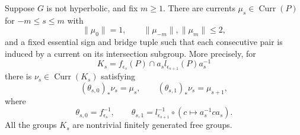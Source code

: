 \begin{lemma}
\label{ann:finite-current-window}
Suppose $G$ is not hyperbolic, and fix $m\geq1$.  There are currents
$\mu_s\in\operatorname{Curr}(P)$ for $-m\leq s\leq m$ with
\begin{equation}
 \|\mu_0\|=1,\qquad \|\mu_{-m}\|,\|\mu_m\|\leq2,
 \label{ann:finite-end-bounds}
\end{equation}
and a fixed essential sign and bridge tuple such that each consecutive
pair is induced by a current on its intersection subgroup.  More
precisely, for
\[
 K_s=f_{\epsilon_s}(P)\cap
             a_s l_{\epsilon_{s+1}}(P)a_s^{-1}
\]
there is $\nu_s\in\operatorname{Curr}(K_s)$ satisfying
\begin{equation}
 (\theta_{s,0})_*\nu_s=\mu_s,
 \qquad(\theta_{s,1})_*\nu_s=\mu_{s+1},
 \label{ann:finite-compatibility}
\end{equation}
where
\[
 \theta_{s,0}=f_{\epsilon_s}^{-1},\qquad
 \theta_{s,1}=l_{\epsilon_{s+1}}^{-1}
                \circ(c\mapsto a_s^{-1}ca_s).
\]
All the groups $K_s$ are nontrivial finitely generated free groups.
\end{lemma}

